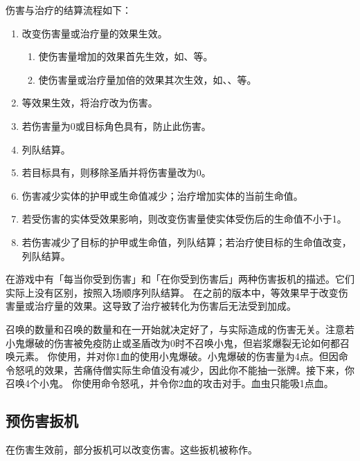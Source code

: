 伤害与治疗的结算流程如下：
\begin{enumerate}
    \item 改变伤害量或治疗量的效果生效。
    \begin{enumerate}
        \item 使伤害量增加的效果首先生效，如、等。
        \item 使伤害量或治疗量加倍的效果其次生效，如、、等。
    \end{enumerate}
    \item {}等效果生效，将治疗改为伤害。
    \item 若伤害量为0或目标角色具有，防止此伤害。
    \item {}列队结算。
    \item 若目标具有，则移除圣盾并将伤害量改为0。
    \item 伤害减少实体的护甲或生命值减少；治疗增加实体的当前生命值。
    \item 若受伤害的实体受效果影响，则改变伤害量使实体受伤后的生命值不小于1。
    \item 若伤害减少了目标的护甲或生命值，列队结算；若治疗使目标的生命值改变，列队结算。
\end{enumerate}

\notice 在游戏中有「每当你受到伤害」和「在你受到伤害后」两种伤害扳机的描述。它们实际上没有区别，按照入场顺序列队结算。
\notice {}在之前的版本中，等效果早于改变伤害量或治疗量的效果。这导致了治疗被转化为伤害后无法受到加成。

召唤的数量和召唤的数量和在一开始就决定好了，与实际造成的伤害无关。注意若小鬼爆破的伤害被免疫防止或圣盾改为0时不召唤小鬼，但岩浆爆裂无论如何都召唤元素。
\example 你使用，并对你1血的使用小鬼爆破。小鬼爆破的伤害量为4点。但因命令怒吼的效果，苦痛侍僧实际生命值没有减少，因此你不能抽一张牌。接下来，你召唤4个小鬼。
\example 你使用命令怒吼，并令你2血的攻击对手。血虫只能吸1点血。

\subsection{预伤害扳机}
\label{predamage-trigger}

在伤害生效前，部分扳机可以改变伤害。这些扳机被称作。

